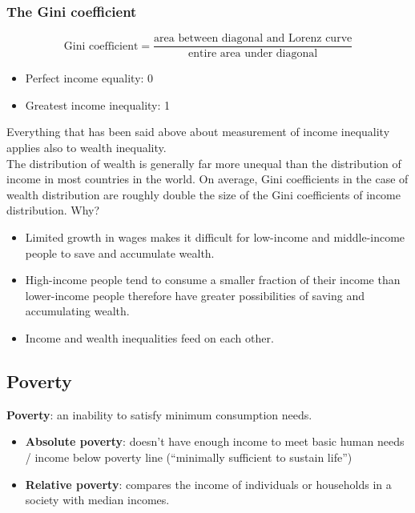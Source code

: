 \documentclass[a4paper,12pt]{article}
\newcommand{\needbold}[1]{\textcolor{red!70!black}{\textbf{#1}}}
\begin{document}
\subsubsection*{The Gini coefficient}
$$\text{Gini coefficient}=\dfrac{\text{area between diagonal and Lorenz curve}}{\text{entire area under diagonal}}$$
\begin{itemize}
  \item Perfect income equality: 0
  \item Greatest income inequality: 1
\end{itemize}
Everything that has been said above about measurement of income inequality applies also to wealth inequality.\\
The distribution of wealth is generally far more unequal than the distribution of income in most countries in the world. On average, Gini coefficients in the case of wealth distribution are roughly double the size of the Gini coefficients of income distribution. Why?
\begin{itemize}
  \item Limited growth in wages makes it difficult for low-income and middle-income people to save and accumulate wealth.
  \item High-income people tend to consume a smaller fraction of their income than lower-income people therefore have greater possibilities of saving and accumulating wealth.
  \item Income and wealth inequalities feed on each other.
\end{itemize}
\subsection{Poverty}
\needbold{Poverty}: an inability to satisfy minimum consumption needs.
\begin{itemize}
  \item \needbold{Absolute poverty}: doesn't have enough income to meet basic human needs / income below poverty line (``minimally sufficient to sustain life'')
  \item \needbold{Relative poverty}: compares the income of individuals or households in a society with median incomes.
\end{itemize}
\end{document}

